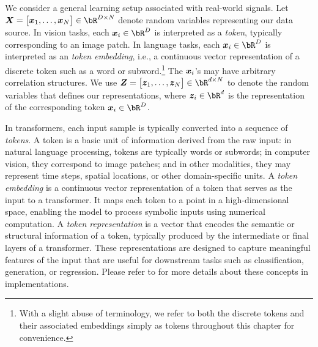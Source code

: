 \documentclass[../../book-main.tex]{subfiles}
\begin{document}

We consider a general learning setup associated with real-world signals. Let \(\X = \mat{\x_{1}, \dots, \x_{N}} \in \bR^{D \times N}\) denote random variables representing our data source. In vision tasks, each \(\x_{i} \in \bR^{D}\) is interpreted as a \textit{token}, typically corresponding to an image patch. In language tasks, each \(\x_{i} \in \bR^{D}\) is interpreted as an \textit{token embedding}, i.e., a continuous vector representation of a discrete token such as a word or subword.\footnote{With a slight abuse of terminology, we refer to both the discrete tokens and their associated embeddings simply as tokens throughout this chapter for convenience.}  %
The \(\bm{x}_{i}\)'s may have arbitrary correlation structures. We use \(\Z = \mat{\z_{1}, \dots, \z_{N}} \in \bR^{d \times N}\) to denote the random variables that defines our representations, where \(\z_{i} \in \bR^{d}\) is the representation of the corresponding token \(\x_i \in \bR^{D}\).%

\begin{remark}
    In transformers, each input sample is typically converted into a sequence of {\em tokens}. A token is a basic unit of information derived from the raw input: in natural language processing, tokens are typically words or subwords; in computer vision, they correspond to image patches; and in other modalities, they may represent time steps, spatial locations, or other domain-specific units. A {\em token embedding} is a continuous vector representation of a token that serves as the input to a transformer. It maps each token to a point in a high-dimensional space, enabling the model to process symbolic inputs using numerical computation.
    A {\em token representation} is a vector that encodes the semantic or structural information of a token, typically produced by the intermediate or final layers of a transformer. These representations are designed to capture meaningful features of the input that are useful for downstream tasks such as classification, generation, or regression. Please refer to  for more details about these concepts in implementations. 
\end{remark}
\end{document}
